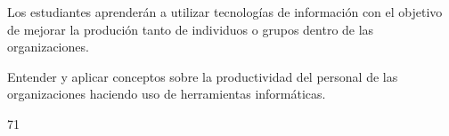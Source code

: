 ﻿\begin{syllabus}


\begin{justification}
Los estudiantes aprenderán a utilizar tecnologías de información con el objetivo de mejorar
la produción tanto de individuos o grupos dentro de las organizaciones.
\end{justification}

\begin{goals}
\item Entender y aplicar conceptos  sobre la productividad del personal de las organizaciones haciendo uso de herramientas informáticas.
\end{goals}

\begin{outcomes}
\end{outcomes}

\begin{unit}{\LUONEDef}{\LUONEBib}{7}{1}
   \begin{topics}
   	\item \ITONETopicONExONExONE
      \begin{subtopics}
      	\item \ITONETopicONExONExONExTWO
      	\item \ITONETopicONExONExONExTHREE
      \end{subtopics}	
      \item \ITONETopicONExONExTHREE
      \item \ITONETopicONExONExFOUR
      \item \ITTWOTopicONExTWOxONE
      \begin{subtopics}
	      \item \ITTWOTopicONExTWOxONExFOUR
      \end{subtopics}	
      \item \ITTWOTopicONExTWOxTHREE
      \item \ITFOURTopicONExFOURxONE
      \item \ITFOURTopicONExFOURxTWO
      \item \ITSIXTopicONExSIXxONE
      \item \ITSIXTopicONExSIXxTHREE
      \item \ITSIXTopicONExSIXxNINE
      \item \OMCTWOTopicTWOxTWOxONEONE
      \item \OMCTWOTopicTWOxTWOxONESIX
      \item \OMCTHREETopicTWOxTHREExTHREE
      \item \TDSONETopicTHREExONExTWO
      \item \TDSONETopicTHREExONExFOUR
      \item \TDSONETopicTHREExONExFIVE
   \end{topics}
	\LUONEGoal
\end{unit}


\end{syllabus}
